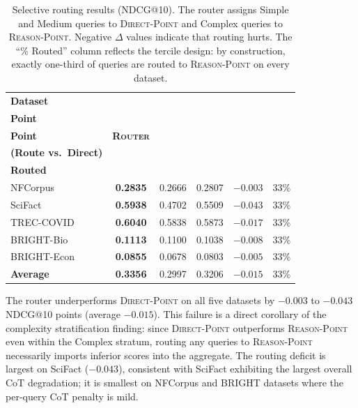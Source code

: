 \documentclass[12pt]{article}
\makeatletter
\newcommand{\ndcg}{NDCG@10}
\newcommand{\direct}{\textsc{Direct-Point}}
\newcommand{\reason}{\textsc{Reason-Point}}
\newcommand{\router}{\textsc{Router}}
\newcommand{\CoT}{CoT}
\makeatother
\begin{document}
\begin{table}[htbp]
\caption{Selective routing results (\ndcg{}).  The router assigns Simple and
         Medium queries to \direct{} and Complex queries to \reason{}.  Negative
         $\Delta$ values indicate that routing hurts.  The ``\% Routed'' column
         reflects the tercile design: by construction, exactly one-third of
         queries are routed to \reason{} on every dataset.}
\label{tab:routing}
\centering
\small
\setlength{\tabcolsep}{5pt}
\renewcommand{\arraystretch}{1.35}
\begin{tabular}{@{}lcccc c@{}}
\toprule
\textbf{Dataset} &
\makecell{\textbf{Direct-}\\\textbf{Point}} &
\makecell{\textbf{Reason-}\\\textbf{Point}} &
\textbf{\router{}} &
\makecell{$\bm{\Delta}$\\\textbf{(Route vs.~Direct)}} &
\makecell{\textbf{\%}\\\textbf{Routed}} \\
\midrule
\rowcolor{rowgray}
NFCorpus    & \textbf{0.2835} & 0.2666 & 0.2807 & $-0.003$ & 33\% \\
SciFact     & \textbf{0.5938} & 0.4702 & 0.5509 & $-0.043$ & 33\% \\
\rowcolor{rowgray}
TREC-COVID  & \textbf{0.6040} & 0.5838 & 0.5873 & $-0.017$ & 33\% \\
BRIGHT-Bio  & \textbf{0.1113} & 0.1100 & 0.1038 & $-0.008$ & 33\% \\
\rowcolor{rowgray}
BRIGHT-Econ & \textbf{0.0855} & 0.0678 & 0.0803 & $-0.005$ & 33\% \\
\midrule
\textbf{Average} & \textbf{0.3356} & 0.2997 & 0.3206 & $-0.015$ & 33\% \\
\bottomrule
\end{tabular}
\end{table}

The router underperforms \direct{} on all five datasets by $-0.003$ to
$-0.043$ \ndcg{} points (average $-0.015$).  This failure is a direct
corollary of the complexity stratification finding: since \direct{} outperforms
\reason{} even within the Complex stratum, routing any queries to \reason{}
necessarily imports inferior scores into the aggregate.  The routing deficit is
largest on SciFact ($-0.043$), consistent with SciFact exhibiting the largest
overall \CoT{} degradation; it is smallest on NFCorpus and BRIGHT datasets where
the per-query \CoT{} penalty is mild.

\end{document}
